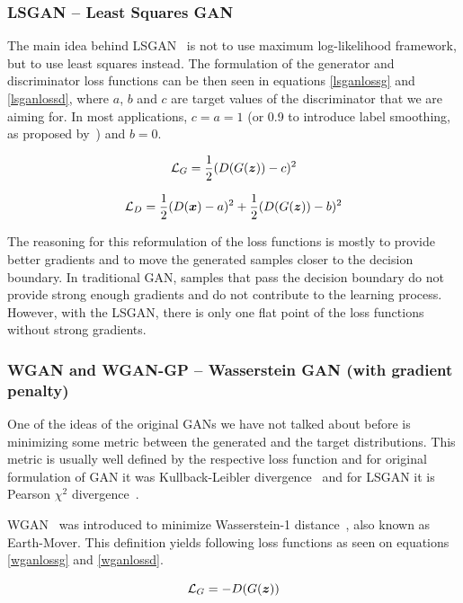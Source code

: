 \subsubsection{LSGAN -- Least Squares GAN}
The main idea behind LSGAN~\cite{lsgan} is not to use maximum log-likelihood framework, but to use least squares instead. The formulation of the generator and discriminator loss functions can be then seen in equations \ref{lsganlossg} and \ref{lsganlossd}, where $a$, $b$ and $c$ are target values of the discriminator that we are aiming for. In most applications, $c = a = 1$ (or 0.9 to introduce label smoothing, as proposed by~\cite{improvedgan,smooth}) and $b = 0$.

\begin{equation}
\mathcal{L}_G = \frac{1}{2}(D(G(\bm{z})) - c)^2
\label{lsganlossg}
\end{equation}

\begin{equation}
\mathcal{L}_D = \frac{1}{2}(D(\bm{x}) - a)^2 + \frac{1}{2}(D(G(\bm{z})) - b)^2
\label{lsganlossd}
\end{equation}

The reasoning for this reformulation of the loss functions is mostly to provide better gradients and to move the generated samples closer to the decision boundary. In traditional GAN, samples that pass the decision boundary do not provide strong enough gradients and do not contribute to the learning process. However, with the LSGAN, there is only one flat point of the loss functions without strong gradients.

\subsubsection{WGAN and WGAN-GP -- Wasserstein GAN (with gradient penalty)}

One of the ideas of the original GANs we have not talked about before is minimizing some metric between the generated and the target distributions. This metric is usually well defined by the respective loss function and for original formulation of GAN it was Kullback-Leibler divergence~\cite{kullback} and for LSGAN it is Pearson $\chi^2$ divergence~\cite{pearson}.

WGAN~\cite{wgan} was introduced to minimize Wasserstein-1 distance~\cite{wasser}, also known as Earth-Mover. This definition yields following loss functions as seen on equations \ref{wganlossg} and \ref{wganlossd}.

\begin{equation}
\mathcal{L}_G = -D(G(\bm{z}))
\label{wganlossg}
\end{equation}

